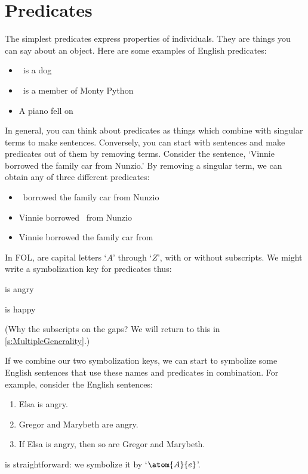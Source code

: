 \section{Predicates}
The simplest predicates express properties of individuals. They are things you can say about an object. Here are some examples of English predicates:
	\begin{itemize}
		\item \blank\ is a dog
		\item \blank\ is a member of Monty Python
		\item A piano fell on \blank
	\end{itemize}
In general, you can think about predicates as things which combine with singular terms to make sentences. Conversely, you can start with sentences and make predicates out of them by removing terms. Consider the sentence, `Vinnie borrowed the family car from Nunzio.' By removing a singular term, we can obtain any of three different predicates:
	\begin{itemize}
		\item \blank\ borrowed the family car from Nunzio\\
		\item Vinnie borrowed \blank\ from Nunzio\\
		\item Vinnie borrowed the family car from \blank
	\end{itemize}
In FOL,  are capital letters `$A$' through `$Z$', with or without subscripts. We might write a symbolization key for predicates thus:
	\begin{ekey}
		\item[\atom{A}{x}]  is angry
		\item[\atom{H}{x}]  is happy
	\end{ekey}
        (Why the subscripts on the gaps? We will return to this in \cref{s:MultipleGenerality}.)


If we combine our two symbolization keys, we can start to symbolize some English sentences that use these names and predicates in combination. For example, consider the English sentences:
	\begin{enumerate}
		\item\label{terms1} Elsa is angry.
		\item\label{terms2a} Gregor and Marybeth are angry.
		\item\label{terms2} If Elsa is angry, then so are Gregor and Marybeth.
	\end{enumerate}
 is straightforward: we symbolize it by `$\atom{A}{e}$'.

